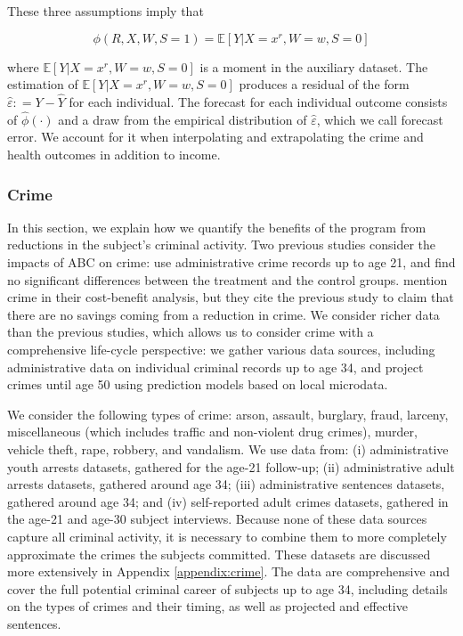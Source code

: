 \noindent These three assumptions imply that 

\begin{equation}
\phi \left( R, X, W, S = 1 \right) = \mathbb{E} \left[ Y | X = x^r, W = w, S = 0 \right]  
\end{equation}

\noindent where $\mathbb{E} \left[ Y | X = x^r, W = w, S = 0 \right]$ is a moment in the auxiliary dataset. The estimation of $\mathbb{E} \left[ Y | X = x^r, W = w, S = 0 \right]$ produces a residual of the form $\widehat{\varepsilon} : = Y - \widehat{Y}$ for each individual. The forecast for each  individual outcome consists of $\widehat{\phi} \left( \cdot \right)$ and a draw from the empirical distribution of $\widehat{\varepsilon}$, which we call forecast error. We account for it when interpolating and extrapolating the crime and health outcomes in addition to income.

\subsubsection{Crime}  \label{sec:crime}

In this section, we explain how we quantify the benefits of the program from reductions in the subject's criminal activity. Two previous studies consider the impacts of ABC on crime: \citet{Clarke_Campbell_1998_ABC_Comparison_ECRQ} use administrative crime records up to age 21, and find no significant differences between the treatment and the control groups. \cite{Barnett_Masse_2007_EER} mention crime in their cost-benefit analysis, but they cite the previous study to claim that there are no savings coming from a reduction in crime. We consider richer data than the previous studies, which allows us to consider crime with a comprehensive life-cycle perspective: we gather various data sources, including administrative data on individual criminal records up to age 34, and project crimes until age 50 using prediction models based on local microdata.

We consider the following types of crime: arson, assault, burglary, fraud, larceny, miscellaneous (which includes traffic and non-violent drug crimes), murder, vehicle theft, rape, robbery, and vandalism. We use data from: (i) administrative youth arrests datasets, gathered for the age-21 follow-up; (ii) administrative adult arrests datasets, gathered around age 34; (iii) administrative sentences datasets, gathered around age 34; and (iv) self-reported adult crimes datasets, gathered in the age-21 and age-30 subject interviews. Because none of these data sources capture all criminal activity, it is necessary to combine them to more completely approximate the crimes the subjects committed. These datasets are discussed more extensively in Appendix \ref{appendix:crime}. The data are comprehensive and cover the full potential criminal career of subjects up to age 34, including details on the types of crimes and their timing, as well as projected and effective sentences.

